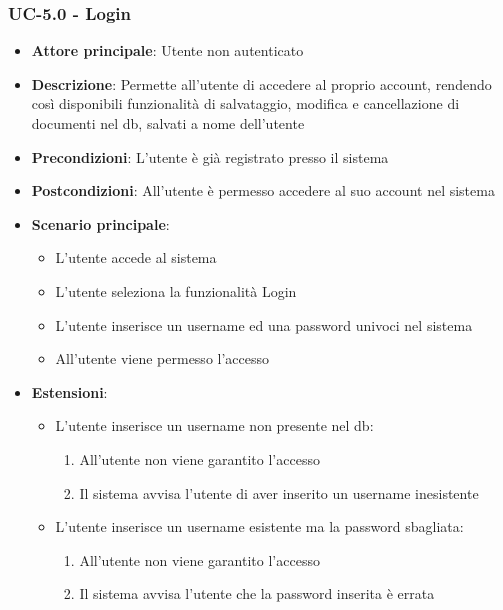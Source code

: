\documentclass[11pt,a4paper]{article}
\begin{document}
\subsubsection{UC-5.0 - Login}
\begin{itemize}
    \item \textbf{Attore principale}: Utente non autenticato
    \item \textbf{Descrizione}: Permette all'utente di accedere al proprio account, rendendo così disponibili funzionalità di salvataggio, modifica e cancellazione di documenti nel db, salvati a nome dell'utente
    \item \textbf{Precondizioni}: L'utente è già registrato presso il sistema
    \item \textbf{Postcondizioni}: All'utente è permesso accedere al suo account nel sistema
    \item \textbf{Scenario principale}:
        \begin{itemize}
            \item L'utente accede al sistema
            \item L'utente seleziona la funzionalità Login
            \item L'utente inserisce un username ed una password univoci nel sistema
            \item All'utente viene permesso l'accesso
        \end{itemize}
    \item \textbf{Estensioni}:
        \begin{itemize}
            \item L'utente inserisce un username non presente nel db:
                \begin{enumerate}
                    \item All'utente non viene garantito l'accesso
                    \item Il sistema avvisa l'utente di aver inserito un username inesistente
                \end{enumerate}
            \item L'utente inserisce un username esistente ma la password sbagliata:
                \begin{enumerate}
                    \item All'utente non viene garantito l'accesso
                    \item Il sistema avvisa l'utente che la password inserita è errata
                \end{enumerate}
        \end{itemize}
\end{itemize}
\end{document}
